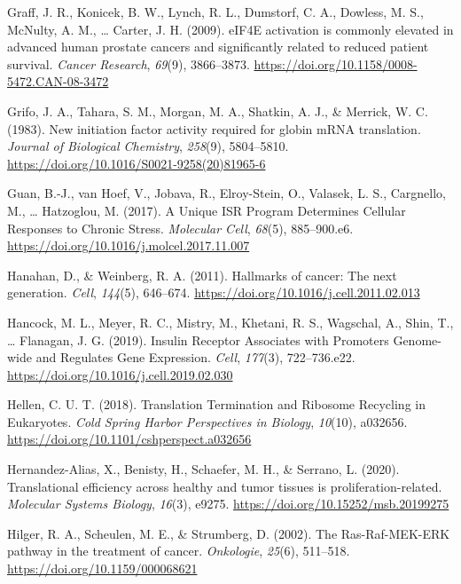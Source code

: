 \documentclass[12pt,openany]{book}
\begin{document}
\hypertarget{ref-Graff2009}{}
Graff, J. R., Konicek, B. W., Lynch, R. L., Dumstorf, C. A., Dowless, M.
S., McNulty, A. M., \ldots{} Carter, J. H. (2009). eIF4E activation is
commonly elevated in advanced human prostate cancers and significantly
related to reduced patient survival. \emph{Cancer Research},
\emph{69}(9), 3866--3873.
\url{https://doi.org/10.1158/0008-5472.CAN-08-3472}

\hypertarget{ref-Grifo1983}{}
Grifo, J. A., Tahara, S. M., Morgan, M. A., Shatkin, A. J., \& Merrick,
W. C. (1983). New initiation factor activity required for globin mRNA
translation. \emph{Journal of Biological Chemistry}, \emph{258}(9),
5804--5810. \url{https://doi.org/10.1016/S0021-9258(20)81965-6}

\hypertarget{ref-Guan2017}{}
Guan, B.-J., van Hoef, V., Jobava, R., Elroy-Stein, O., Valasek, L. S.,
Cargnello, M., \ldots{} Hatzoglou, M. (2017). A Unique ISR Program
Determines Cellular Responses to Chronic Stress. \emph{Molecular Cell},
\emph{68}(5), 885--900.e6.
\url{https://doi.org/10.1016/j.molcel.2017.11.007}

\hypertarget{ref-Hanahan2011}{}
Hanahan, D., \& Weinberg, R. A. (2011). Hallmarks of cancer: The next
generation. \emph{Cell}, \emph{144}(5), 646--674.
\url{https://doi.org/10.1016/j.cell.2011.02.013}

\hypertarget{ref-Hancock2019}{}
Hancock, M. L., Meyer, R. C., Mistry, M., Khetani, R. S., Wagschal, A.,
Shin, T., \ldots{} Flanagan, J. G. (2019). Insulin Receptor Associates
with Promoters Genome-wide and Regulates Gene Expression. \emph{Cell},
\emph{177}(3), 722--736.e22.
\url{https://doi.org/10.1016/j.cell.2019.02.030}

\hypertarget{ref-Hellen2018}{}
Hellen, C. U. T. (2018). Translation Termination and Ribosome Recycling
in Eukaryotes. \emph{Cold Spring Harbor Perspectives in Biology},
\emph{10}(10), a032656.
\url{https://doi.org/10.1101/cshperspect.a032656}

\hypertarget{ref-Hernandez-Alias2020}{}
Hernandez-Alias, X., Benisty, H., Schaefer, M. H., \& Serrano, L.
(2020). Translational efficiency across healthy and tumor tissues is
proliferation-related. \emph{Molecular Systems Biology}, \emph{16}(3),
e9275. \url{https://doi.org/10.15252/msb.20199275}

\hypertarget{ref-Hilger2002}{}
Hilger, R. A., Scheulen, M. E., \& Strumberg, D. (2002). The
Ras-Raf-MEK-ERK pathway in the treatment of cancer. \emph{Onkologie},
\emph{25}(6), 511--518. \url{https://doi.org/10.1159/000068621}
\end{document}
